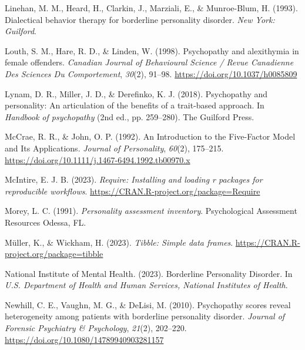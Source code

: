 \documentclass[
  man,floatsintext]{apa7}
\newlength{\cslhangindent}
\newlength{\cslentryspacingunit} %
\newenvironment{CSLReferences}[2] %
 {%
  \setlength{\parindent}{0pt}
  \ifodd #1
  \let\oldpar\par
  \def\par{\hangindent=\cslhangindent\oldpar}
  \fi
  \setlength{\parskip}{#2\cslentryspacingunit}
 }%
 {}
\begin{document}
\begin{CSLReferences}{1}{0}
\leavevmode{}%
Linehan, M. M., Heard, H., Clarkin, J., Marziali, E., \& Munroe-Blum, H. (1993). Dialectical behavior therapy for borderline personality disorder. \emph{New York: Guilford}.

\leavevmode{}%
Louth, S. M., Hare, R. D., \& Linden, W. (1998). Psychopathy and alexithymia in female offenders. \emph{Canadian Journal of Behavioural Science / Revue Canadienne Des Sciences Du Comportement}, \emph{30}(2), 91--98. \url{https://doi.org/10.1037/h0085809}

\leavevmode{}%
Lynam, D. R., Miller, J. D., \& Derefinko, K. J. (2018). Psychopathy and personality: {An} articulation of the benefits of a trait-based approach. In \emph{Handbook of psychopathy} (2nd ed., pp. 259--280). {The Guilford Press}.

\leavevmode{}%
McCrae, R. R., \& John, O. P. (1992). An {Introduction} to the {Five}-{Factor Model} and {Its Applications}. \emph{Journal of Personality}, \emph{60}(2), 175--215. \url{https://doi.org/10.1111/j.1467-6494.1992.tb00970.x}

\leavevmode{}%
McIntire, E. J. B. (2023). \emph{Require: Installing and loading r packages for reproducible workflows}. \url{https://CRAN.R-project.org/package=Require}

\leavevmode{}%
Morey, L. C. (1991). \emph{Personality assessment inventory}. Psychological Assessment Resources Odessa, FL.

\leavevmode{}%
Müller, K., \& Wickham, H. (2023). \emph{Tibble: Simple data frames}. \url{https://CRAN.R-project.org/package=tibble}

\leavevmode{}%
National Institute of Mental Health. (2023). Borderline {Personality Disorder}. In \emph{U.S. Department of Health and Human Services, National Institutes of Health}.

\leavevmode{}%
Newhill, C. E., Vaughn, M. G., \& DeLisi, M. (2010). Psychopathy scores reveal heterogeneity among patients with borderline personality disorder. \emph{Journal of Forensic Psychiatry \& Psychology}, \emph{21}(2), 202--220. \url{https://doi.org/10.1080/14789940903281157}


\end{CSLReferences}
\end{document}
